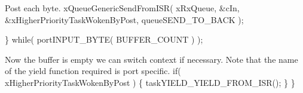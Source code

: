 \begin{DoxyPre}Post each byte.
        xQueueGenericSendFromISR( xRxQueue, &cIn, &xHigherPriorityTaskWokenByPost, queueSEND\_TO\_BACK );\end{DoxyPre}



\begin{DoxyPre}    \} while( portINPUT\_BYTE( BUFFER\_COUNT ) );\end{DoxyPre}



\begin{DoxyPre}Now the buffer is empty we can switch context if necessary.  Note that the
name of the yield function required is port specific.
    if( xHigherPriorityTaskWokenByPost )
    \{
        taskYIELD\_YIELD\_FROM\_ISR();
    \}
 \}
 \end{DoxyPre}
 
